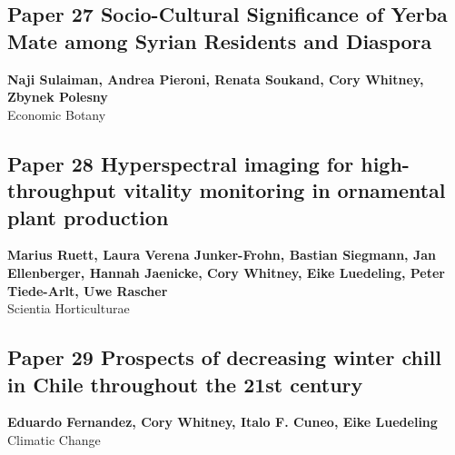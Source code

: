 \documentclass[
]{article}
\begin{document}
\newpage

\hypertarget{sulaiman_socio-cultural_2021}{%
\subsection{Paper 27 Socio-Cultural Significance of Yerba Mate among
Syrian Residents and Diaspora}\label{sulaiman_socio-cultural_2021}}

\begin{center}
\vspace*{2cm}
{\Large \textbf{Naji Sulaiman, Andrea Pieroni, Renata Soukand, Cory Whitney, Zbynek Polesny}} \\[0.5cm]
\vspace*{1cm}
{\Large Economic Botany} \\[2cm]
\end{center}


\newpage

\hypertarget{ruett_hyperspectral_2022}{%
\subsection{Paper 28 Hyperspectral imaging for high-throughput vitality
monitoring in ornamental plant
production}\label{ruett_hyperspectral_2022}}

\begin{center}
\vspace*{2cm}
{\Large \textbf{Marius Ruett, Laura Verena Junker-Frohn, Bastian Siegmann, Jan Ellenberger, Hannah Jaenicke, Cory Whitney, Eike Luedeling, Peter Tiede-Arlt, Uwe Rascher}} \\[0.5cm]
\vspace*{1cm}
{\Large Scientia Horticulturae} \\[2cm]
\end{center}


\newpage

\hypertarget{fernandez_prospects_2020}{%
\subsection{Paper 29 Prospects of decreasing winter chill in Chile
throughout the 21st century}\label{fernandez_prospects_2020}}

\begin{center}
\vspace*{2cm}
{\Large \textbf{Eduardo Fernandez, Cory Whitney, Italo F. Cuneo, Eike Luedeling}} \\[0.5cm]
\vspace*{1cm}
{\Large Climatic Change} \\[2cm]
\end{center}

\end{document}
